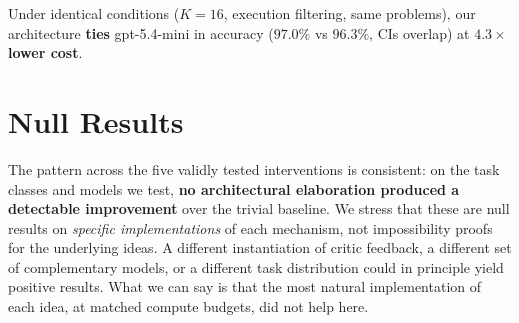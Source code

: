 \documentclass[11pt]{amsart}
\newcommand\1{{\mathds{1}}}
\theoremstyle{definition}
\theoremstyle{remark}
\numberwithin{equation}{section}
\begin{document}
Under identical conditions ($K\!=\!16$, execution filtering, same problems), our architecture \textbf{ties} gpt-5.4-mini in accuracy ($97.0\%$ vs $96.3\%$, CIs overlap) at $\mathbf{4.3\times}$ \textbf{lower cost}.

\section{Null Results}\label{sec:act2-six-nulls}

\begin{table}[h]
\centering\small
\caption{Five architectural interventions tested against the simple verifier-loop baseline, all at matched or higher compute budgets. \textbf{None produced a detectable improvement.} Individual null-result details are in Appendix~\ref{app:null-details}.}
\label{tab:six-nulls}
\end{table}

The pattern across the five validly tested interventions is consistent: on the task classes and models we test, \textbf{no architectural elaboration produced a detectable improvement} over the trivial baseline.
We stress that these are null results on \emph{specific implementations} of each mechanism, not impossibility proofs for the underlying ideas.
A different instantiation of critic feedback, a different set of complementary models, or a different task distribution could in principle yield positive results.
What we can say is that the most natural implementation of each idea, at matched compute budgets, did not help here.
\end{document}
